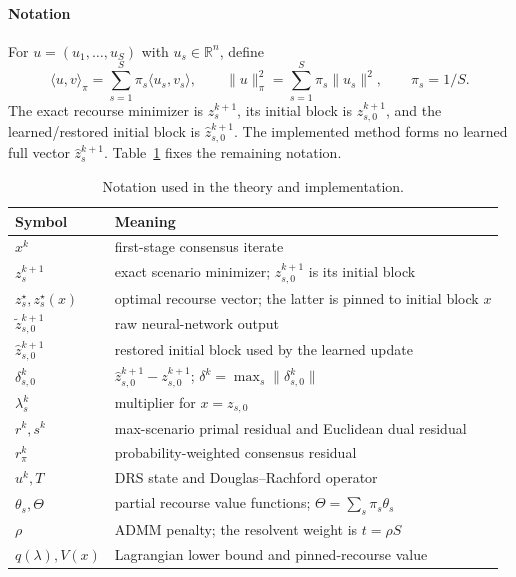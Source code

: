 \documentclass[preprint,12pt,3p]{elsarticle}
\theoremstyle{definition}
\begin{document}
\paragraph{Notation} For $u=(u_1,\ldots,u_S)$ with $u_s\in\mathbb R^n$, define
\[
\langle u,v\rangle_\pi=\sum_{s=1}^S\pi_s\langle u_s,v_s\rangle,\qquad
\|u\|_\pi^2=\sum_{s=1}^S\pi_s\|u_s\|^2,\qquad \pi_s=1/S.
\]
The exact recourse minimizer is $z_s^{k+1}$, its initial block is $z_{s,0}^{k+1}$, and the learned/restored initial block is $\widehat z_{s,0}^{k+1}$. The implemented method forms no learned full vector $\widehat z_s^{k+1}$. Table~\ref{tab:notation} fixes the remaining notation.

\begin{table}[htbp]
\centering
\caption{Notation used in the theory and implementation.}
\label{tab:notation}
\small
\begin{tabular}{ll}
\toprule
Symbol & Meaning\\
\midrule
$x^k$ & first-stage consensus iterate\\
$z_s^{k+1}$ & exact scenario minimizer; $z_{s,0}^{k+1}$ is its initial block\\
$z_s^\star,z_s^\star(x)$ & optimal recourse vector; the latter is pinned to initial block $x$\\
$\widetilde z_{s,0}^{k+1}$ & raw neural-network output\\
$\widehat z_{s,0}^{k+1}$ & restored initial block used by the learned update\\
$\delta_{s,0}^k$ & $\widehat z_{s,0}^{k+1}-z_{s,0}^{k+1}$; $\delta^k=\max_s\|\delta_{s,0}^k\|$\\
$\lambda_s^k$ & multiplier for $x=z_{s,0}$\\
$r^k,s^k$ & max-scenario primal residual and Euclidean dual residual\\
$r_\pi^k$ & probability-weighted consensus residual\\
$u^k,T$ & DRS state and Douglas--Rachford operator\\
$\theta_s,\Theta$ & partial recourse value functions; $\Theta=\sum_s\pi_s\theta_s$\\
$\rho$ & ADMM penalty; the resolvent weight is $t=\rho S$\\
$q(\lambda),V(x)$ & Lagrangian lower bound and pinned-recourse value\\
\bottomrule
\end{tabular}
\end{table}
\end{document}
